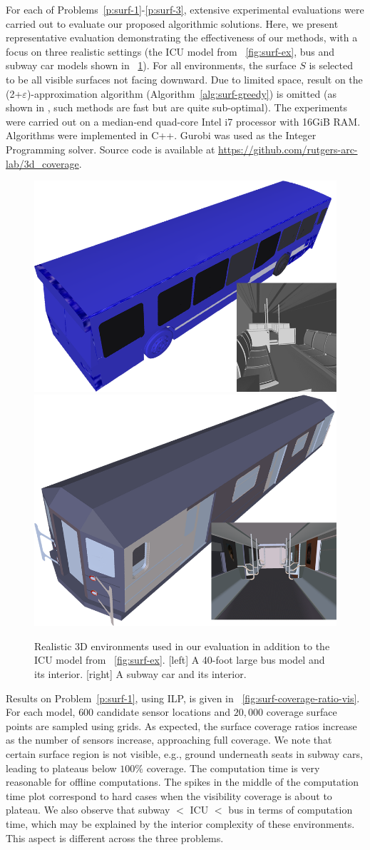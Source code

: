 For each of Problems~\ref{p:surf-1}-\ref{p:surf-3}, extensive experimental evaluations were carried out to evaluate our proposed algorithmic solutions. Here, we present representative evaluation demonstrating the effectiveness of our methods, with a focus on three realistic settings (the ICU model from ~\ref{fig:surf-ex}, bus and subway car models shown in ~\ref{fig:surf-bus-subway}). %
For all environments, the surface $S$ is selected to be all visible surfaces not facing downward.
Due to limited space, result on the (2+$\varepsilon$)-approximation algorithm (Algorithm~\ref{alg:surf-greedy}) is omitted (as shown in \cite{fengyu2020optimally}, such methods are fast but are quite sub-optimal). The experiments were carried out on a median-end quad-core Intel i7 processor with 16GiB RAM. 
Algorithms were implemented in C++. Gurobi \cite{optimization2019gurobi} was used as the Integer Programming solver. 
Source code is available at 
{\small \url{https://github.com/rutgers-arc-lab/3d_coverage}}.

\begin{figure}[!ht]
    \centering
    \includegraphics[width = .4\columnwidth]{chapters/surf/fig/bus.png}\hspace{3mm}
    \includegraphics[width = .4\columnwidth]{chapters/surf/fig/subway.png}
    \caption{Realistic 3D environments used in our evaluation in addition to the ICU model from ~\ref{fig:surf-ex}. [left] A 40-foot large bus model and its interior. [right] A subway car and its interior.}
    \label{fig:surf-bus-subway}
\end{figure}

Results on Problem~\ref{p:surf-1}, using ILP, is given in ~\ref{fig:surf-coverage-ratio-vis}. 
For each model, $600$ candidate sensor locations and $20,000$ coverage surface points are sampled using grids. 
As expected, the surface coverage ratios increase as the number of sensors increase, approaching full coverage. We note that certain surface region is not visible, e.g., ground underneath seats in subway cars, leading to plateaus below $100\%$ coverage. The computation time is very reasonable for offline computations. The spikes in the middle of the computation time plot correspond to hard cases when the visibility coverage is about to plateau. We also observe that subway $<$ ICU $<$ bus in terms 
of computation time, which may be explained by the interior complexity of these environments. This aspect is different across the three problems.

